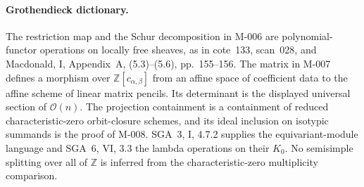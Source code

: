 \paragraph{Grothendieck dictionary.}
The restriction map and the Schur decomposition in M-006 are
polynomial-functor operations on locally free sheaves, as in
cote~133, scan~028, and Macdonald, I, Appendix~A,
(5.3)--(5.6), pp.~155--156.
The matrix in M-007 defines a morphism over
\(\mathbb Z[c_{\alpha,\beta}]\) from an affine space of
coefficient data to the affine scheme of linear matrix pencils.
Its determinant is the displayed universal section of
\(\mathcal O(n)\). The projection containment is a containment
of reduced characteristic-zero orbit-closure schemes, and its
ideal inclusion on isotypic summands is the proof of M-008.
SGA~3, I, 4.7.2 supplies the equivariant-module language and
SGA~6, VI, 3.3 the lambda operations on their \(K_0\).
No semisimple splitting over all of \(\mathbb Z\) is inferred
from the characteristic-zero multiplicity comparison.
